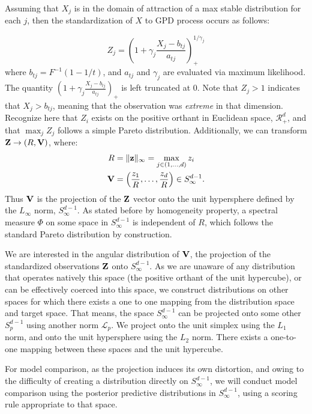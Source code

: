 
Assuming that $X_j$ is in the domain of attraction of a max stable distribution for each $j$, then
  the standardization of $X$ to GPD process occurs as follows:

\begin{equation}
Z_{j} = \left(1 + \gamma_j\frac{X_{j} - b_{tj}}{a_{tj}}\right)_{+}^{1/\gamma_j}
\end{equation}
where $b_{tj} = F^{-1}(1-1/t)$, and $a_{tj}$ and $\gamma_{j}$ are evaluated via maximum likelihood.
  The quantity $\left(1 + \gamma_j\frac{X_{j} - b_{tj}}{a_{tj}}\right)_+$ is left truncated at 0.
  Note that $Z_j > 1$ indicates that $X_{j} > b_{tj}$, meaning that the observation was
  \emph{extreme} in that dimension.  Recognize here that $Z_i$ exists on the positive orthant in
  Euclidean space, $\mathcal{R}_+^d$, and that $\max_jZ_j$ follows a simple Pareto distribution.
  Additionally, we can transform ${\bf Z} \rightarrow (R, {\bf V})$, where:
\begin{equation}
  \begin{aligned}
    R &= \lVert {\bf z} \rVert_{\infty} = \max_{j \in (1,\ldots,d)} z_i\\
    {\bf V} &= \left(\frac{z_1}{R},\ldots,\frac{z_d}{R}\right) \in S_{\infty}^{d-1}.\\
  \end{aligned}
\end{equation}
  Thus ${\bf V}$ is the projection of the ${\bf Z}$ vector onto the unit hypersphere defined by
  the $L_{\infty}$ norm, $S_{\infty}^{d-1}$.  As stated before by homogeneity property, a spectral
  measure $\Phi$ on some space in $S_{\infty}^{d-1}$ is independent of $R$, which follows the
  standard Pareto distribution by construction.

We are interested in the angular distribution of ${\bf V}$, the projection of the standardized
  observations ${\bf Z}$ onto $S_{\infty}^{d-1}$.  As we are unaware of any distribution that
  operates natively this space (the positive orthant of the unit hypercube), or can be effectively
  coerced into this space, we construct distributions on other spaces for which there exists a
  one to one mapping from the distribution space and target space.  That means, the space
  $S_{\infty}^{d-1}$ can be projected onto some other $S_p^{d-1}$ using another norm $\mathcal{L}_p$.
  We project onto the unit simplex using the $L_1$ norm, and onto the unit hypersphere using the
  $L_2$ norm.  There exists a one-to-one mapping between these spaces and the unit hypercube.

For model comparison, as the projection induces its own distortion, and owing to the difficulty of
  creating a distribution directly on $S_{\infty}^{d-1}$, we will conduct model comparison using the
  posterior predictive distributions in $S_{\infty}^{d-1}$, using a scoring rule appropriate
  to that space.

